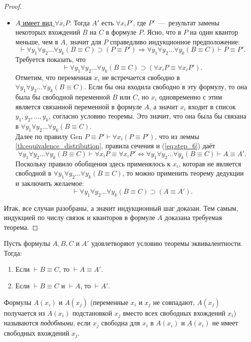 \begin{proof}
\begin{itemize}
        \item \underline{$A$ имеет вид $\forall x_iP$}. Тогда $A'$ есть $\forall x_iP'$, где $P'$~---~результат замены некоторых вхождений $B$ на $C$ в формуле $P$. Ясно, что в $P$ на один квантор меньше, чем в $A$, значит для $P$ справедливо индукционное предположение:
        \begin{equation}\label{eq:step_6}
            \vdash \forall y_1\forall y_2\dots\forall y_k(B \equiv C) \supset (P \equiv P') \Longrightarrow \forall y_1\forall y_2\dots\forall y_k(B \equiv C) \vdash P \equiv P'.
        \end{equation}
        Требуется показать, что
        \[
            \vdash \forall y_1\forall y_2\dots\forall y_k(B \equiv C) \supset (\forall x_iP \equiv \forall x_iP').
        \]
        Отметим, что переменная $x_i$ не встречается свободно в $\forall y_1\forall y_2\dots\forall y_k(B \equiv C)$. Если бы она входила свободно в эту формулу, то она была бы свободной переменной $B$ или $C$, но $x_i$ одновременно с этим является связанной переменной в формуле $A$, а значит $x_i$ входит в список $y_1, y_2, \dots, y_k$, согласно условию теоремы. Это значит, что она была бы связана в $\forall y_1\forall y_2\dots\forall y_k(B \equiv C)$. \\
        Далее по правилу Gen $P \equiv P' \vdash \forall x_i(P \equiv P')$, что из леммы \ref{th:equivalence_distribution}, правила сечения и (\ref{eq:step_6}) даёт
        \[
            \forall y_1\forall y_2\dots\forall y_k(B \equiv C) \vdash \forall x_iP \equiv \forall x_iP' \Longleftrightarrow \forall y_1\forall y_2\dots\forall y_k(B \equiv C) \vdash A \equiv A'.
        \]
        Поскольку правило обобщения здесь применялось к $x_i$, которая не является свободной в $\forall y_1\forall y_2\dots\forall y_k(B \equiv C)$, то можно применить теорему дедукции и заключить желаемое:
        \[
            \vdash \forall y_1\forall y_2\dots\forall y_k(B \equiv C) \supset (A \equiv A').
        \]
    \end{itemize}
    Итак, все случаи разобраны, а значит индукционный шаг доказан. Тем самым, индукцией по числу связок и кванторов в формуле $A$ доказана требуемая теорема.
\end{proof}
\begin{corollary}
    Пусть формулы $A, B, C$ и $A'$ удовлетворяют условию теоремы эквивалентности. Тогда:
    \begin{enumerate}
        \item Если $\vdash B \equiv C$, то $\vdash A \equiv A'$.
        \item Если $\vdash B \equiv C$ и $\vdash A$, то $\vdash A'$.
    \end{enumerate}
\end{corollary}
\begin{definition*}
    Формулы $A(x_i)$ и $A(x_j)$ (переменные $x_i$ и $x_j$ не совпадают, $A(x_j)$ получается из $A(x_i)$ подстановкой $x_j$ вместо всех свободных вхождений $x_i$) называются \textit{подобными}, если $x_j$ свободна для $x_i$ в $A(x_i)$ и $A(x_i)$ не имеет свободных вхождений $x_j$.
\end{definition*}

